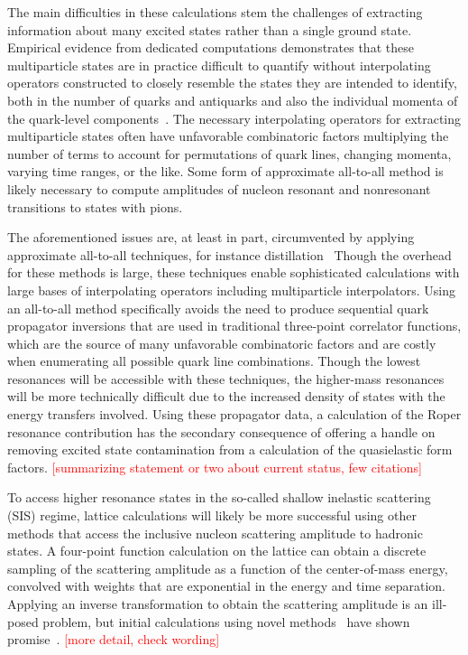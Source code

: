 The main difficulties in these calculations stem the challenges of extracting
 information about many excited states rather than a single ground state.
Empirical evidence from dedicated computations demonstrates that these multiparticle states
 are in practice difficult to quantify without interpolating operators constructed to
 closely resemble the states they are intended to identify,
 both in the number of quarks and antiquarks and also the individual
 momenta of the quark-level components~\cite{Wilson:2015dqa}.
The necessary interpolating operators for extracting multiparticle states often have
 unfavorable combinatoric factors multiplying the number of terms to account for
 permutations of quark lines, changing momenta, varying time ranges, or the like.
Some form of approximate all-to-all method is likely necessary
 to compute amplitudes of nucleon resonant and nonresonant transitions
 to states with pions.

The aforementioned issues are, at least in part, circumvented by applying approximate
 all-to-all techniques, for instance distillation~\cite{HadronSpectrum:2009krc,Morningstar:2011ka}
Though the overhead for these methods is large,
 these techniques enable sophisticated calculations with large bases
 of interpolating operators including multiparticle interpolators.
Using an all-to-all method specifically avoids the need to produce sequential
 quark propagator inversions that are used in traditional three-point correlator functions,
 which are the source of many unfavorable combinatoric factors and are
 costly when enumerating all possible quark line combinations.
Though the lowest resonances will be accessible with these techniques,
 the higher-mass resonances will be more technically difficult
 due to the increased density of states with the energy transfers involved.
Using these propagator data, a calculation of the Roper resonance contribution
 has the secondary consequence of offering a handle on removing excited
 state contamination from a calculation of the quasielastic form factors.
\textcolor{red}{[summarizing statement or two about current status, few citations]}

To access higher resonance states in the so-called shallow inelastic scattering (SIS) regime,
 lattice calculations will likely be more successful using other methods
 that access the inclusive nucleon scattering amplitude to hadronic states.
A four-point function calculation on the lattice can obtain a discrete sampling
 of the scattering amplitude as a function of the center-of-mass energy,
 convolved with weights that are exponential in the energy and time separation.
Applying an inverse transformation to obtain the scattering amplitude
 is an ill-posed problem, but initial calculations
 using novel methods~\cite{Hansen:2017mnd,Bulava:2019kbi,Bruno:2020kyl}
 have shown promise~\cite{Liang:2019frk}.
\textcolor{red}{[more detail, check wording]}

